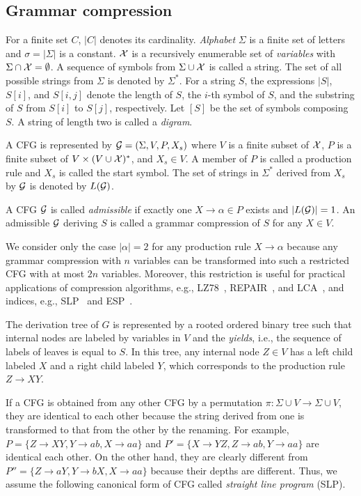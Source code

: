 \documentclass[10pt]{llncs}
\begin{document}
\subsection{Grammar compression}
For a finite set $C$, $|C|$ denotes its cardinality.
{\em Alphabet} $\Sigma$ is a finite set of letters and $\sigma=|\Sigma|$ is a constant. 
$\cal X$ is a recursively enumerable set 
of {\em variables} with $\Sigma\cap \cal{X}=\emptyset$.
A sequence of symbols from $\Sigma\cup \cal{X}$ is called a string.
The set of all possible strings from $\Sigma$ is denoted by $\Sigma^*$.
For a string $S$, the expressions $|S|$, $S[i]$, and $S[i,j]$ 
denote the length of $S$, the $i$-th symbol of $S$,
and the substring of $S$ from $S[i]$ to $S[j]$, respectively.
Let $[S]$ be the set of symbols composing $S$.
A string of length two is called a {\em digram}.

A CFG is represented by ${\cal G}=(\Sigma,V,P,X_s)$ 
where $V$ is a finite subset of $\cal X$, $P$ is a finite subset of 
$V\times (V\cup\cal{X})^*$, and $X_s\in V$.
A member of $P$ is called a production rule and $X_s$ is called the start symbol.
The set of strings in $\Sigma^*$ derived from $X_s$ by ${\cal G}$ is 
denoted by $L({\cal G})$.

A CFG ${\cal G}$ is called {\em admissible} if exactly one $X\to \alpha\in P$ exists and $|L({\cal G})|=1$.
An admissible ${\cal G}$ deriving $S$ is called a grammar compression of $S$ for any $X\in V$.

We consider only the case $|\alpha|=2$ for any production rule $X\to \alpha$
because any grammar compression with $n$ variables can be transformed into 
such a restricted CFG with at most $2n$ variables.
Moreover, this restriction is useful for practical applications of compression algorithms, e.g.,
LZ78~\cite{LZ78}, REPAIR~\cite{Larsson00}, and LCA~\cite{Maruyama2012},
and indices, e.g., SLP~\cite{Claude09} and ESP~\cite{Maruyama2011}.


The derivation tree of $G$ is represented by a rooted ordered binary tree
such that internal nodes are labeled by variables in $V$ and
the {\em yields}, i.e., the sequence of labels of leaves is equal to $S$.
In this tree, any internal node $Z\in V$ has 
a left child labeled $X$ and a right child labeled $Y$, which 
corresponds to the production rule $Z\to XY$.

If a CFG is obtained from any other CFG by a permutation 
$\pi:\Sigma\cup V\to \Sigma\cup V$, they are identical to each other
because the string derived from one is transformed to 
that from the other by the renaming.
For example, $P=\{Z\to XY,Y\to ab,X\to aa\}$ and
$P'=\{X\to YZ,Z\to ab,Y\to aa\}$ are identical each other.
On the other hand, they are clearly different from 
$P''=\{Z\to aY,Y\to bX,X\to aa\}$ because their depths are different.
Thus, we assume the following canonical form of CFG called 
{\em straight line program} (SLP).
\end{document}
